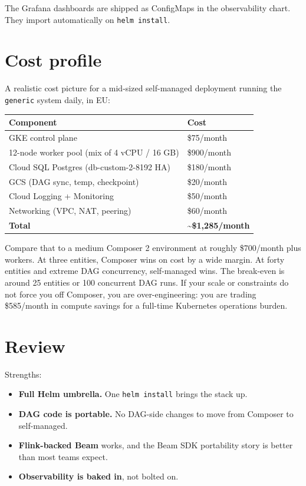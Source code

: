 \documentclass[
  11pt,
  british,
  oneside]{book}
\providecommand{\tightlist}{%
  \setlength{\itemsep}{0pt}\setlength{\parskip}{0pt}}
\begin{document}
The Grafana dashboards are shipped as ConfigMaps in the observability
chart. They import automatically on \texttt{helm\ install}.

\hypertarget{cost-profile}{%
\section{Cost profile}\label{cost-profile}}

A realistic cost picture for a mid-sized self-managed deployment running
the \texttt{generic} system daily, in EU:

\begin{longtable}[]{@{}ll@{}}
\toprule
Component & Cost\tabularnewline
\midrule
\endhead
GKE control plane & \$75/month\tabularnewline
12-node worker pool (mix of 4 vCPU / 16 GB) & \$900/month\tabularnewline
Cloud SQL Postgres (db-custom-2-8192 HA) & \$180/month\tabularnewline
GCS (DAG sync, temp, checkpoint) & \$20/month\tabularnewline
Cloud Logging + Monitoring & \$50/month\tabularnewline
Networking (VPC, NAT, peering) & \$60/month\tabularnewline
\textbf{Total} & \textbf{\textasciitilde\$1,285/month}\tabularnewline
\bottomrule
\end{longtable}

Compare that to a medium Composer 2 environment at roughly \$700/month
plus workers. At three entities, Composer wins on cost by a wide margin.
At forty entities and extreme DAG concurrency, self-managed wins. The
break-even is around 25 entities or 100 concurrent DAG runs. If your
scale or constraints do not force you off Composer, you are
over-engineering: you are trading \$585/month in compute savings for a
full-time Kubernetes operations burden.

\hypertarget{review-2}{%
\section{Review}\label{review-2}}

Strengths:

\begin{itemize}
\tightlist
\item
  \textbf{Full Helm umbrella.} One \texttt{helm\ install} brings the
  stack up.
\item
  \textbf{DAG code is portable.} No DAG-side changes to move from
  Composer to self-managed.
\item
  \textbf{Flink-backed Beam} works, and the Beam SDK portability story
  is better than most teams expect.
\item
  \textbf{Observability is baked in}, not bolted on.
\end{itemize}
\end{document}
